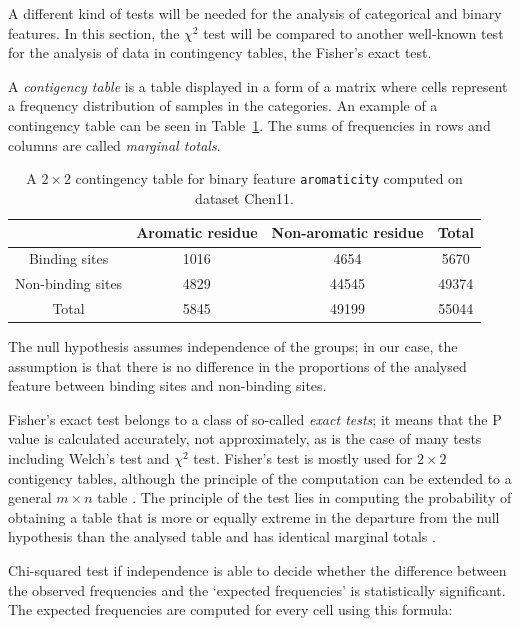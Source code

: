 A different kind of tests will be needed for the analysis of categorical and binary features. In this section, the $\chi^{2}$ test will be compared to another well-known test for the analysis of data in contingency tables, the Fisher's exact test.

A \textit{contigency table} is a table displayed in a form of a matrix where cells represent a frequency distribution of samples in the categories. An example of a contingency table can be seen in Table~\ref{tab:contingency_table_example}. The sums of frequencies in rows and columns are called \textit{marginal totals}.

\begin{table}[!htbp]
\centering
\renewcommand{\arraystretch}{1.5}
 \begin{tabular}{|c|c|c||c|} 
 \hline
  & Aromatic residue & Non-aromatic residue & Total \\ [0.5ex] 
 \hline
 Binding sites & 1016 & 4654 & 5670 \\ 
 \hline
 Non-binding sites & 4829 & 44545 & 49374 \\
 \hline\hline
 Total & 5845 & 49199 & 55044 \\
 \hline
\end{tabular}
\caption{A $2\times 2$ contingency table for binary feature \texttt{aromaticity} computed on dataset Chen11.}\label{tab:contingency_table_example}
\end{table}

The null hypothesis assumes independence of the groups; in our case, the assumption is that there is no difference in the proportions of the analysed feature between binding sites and non-binding sites.

Fisher's exact test belongs to a class of so-called \textit{exact tests}; it means that the P value is calculated accurately, not approximately, as is the case of many tests including Welch's test and $\chi^{2}$ test. Fisher's test is mostly used for $2\times 2$ contigency tables, although the principle of the computation can be extended to a general $m\times n$ table \cite{Mehta}. The principle of the test lies in computing the probability of obtaining a table that is more or equally extreme in the departure from the null hypothesis than the analysed table and has identical marginal totals \cite{bland}.

Chi-squared test if independence is able to decide whether the difference between the observed frequencies and the `expected frequencies' is statistically significant. The expected frequencies are computed for every cell using this formula:

